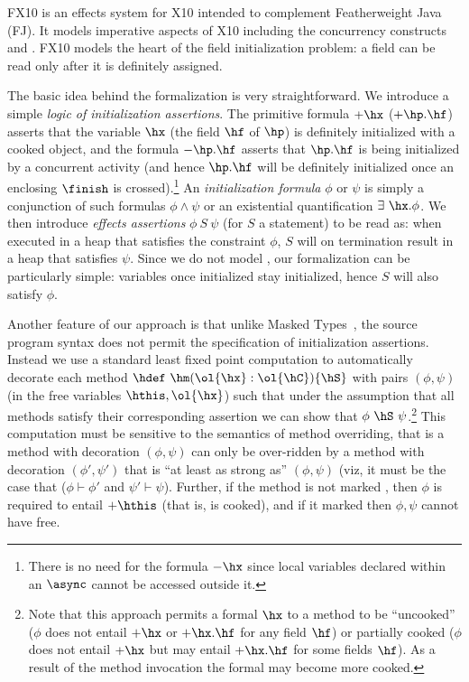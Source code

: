 FX10 is an effects system for X10 intended to complement Featherweight Java
(FJ). It models imperative aspects of X10 including the concurrency
constructs \finish{} and \async{}. 
FX10 models the heart of the field initialization problem:
    a field can be read only after it  is definitely assigned. 


The basic idea behind the formalization is very straightforward. We
introduce a simple {\em logic of initialization assertions}.  The
primitive formula $+\hx$ ($+\hp.\hf$) asserts that the variable $\hx$
(the field $\hf$ of $\hp$) is definitely initialized with a cooked
object, and the formula $-\hp.\hf$ asserts that $\hp.\hf$ is being
initialized by a concurrent activity (and hence $\hp.\hf$ will be
definitely initialized once an enclosing $\finish$ is
crossed).\footnote{There is no need for the formula $-\hx$ since local
  variables declared within an $\async$ cannot be accessed outside
  it.}  An {\em initialization formula} $\phi$ or $\psi$ is simply a
conjunction of such formulas $\phi \wedge \psi$ or an existential
quantification $\exists~\hx.\phi$.  We then introduce {\em effects
  assertions} $\phi~S~\psi$ (for $S$ a statement) to be read as: when
executed in a heap that satisfies the constraint $\phi$, $S$ will on
termination result in a heap that satisfies $\psi$.  Since we do not
model , our formalization can be particularly simple:
variables once initialized stay initialized, hence $S$ will also
satisfy $\phi$.

Another feature of our approach is that unlike Masked
Types~\cite{XinQi:2009}, the source program syntax does not permit the
specification of initialization assertions. Instead we use a standard
least fixed point computation to automatically decorate each method
$\hdef~\hm(\ol{\hx}:\ol{\hC})\{\hS\}$ with pairs $(\phi, \psi)$ (in the free
variables $\hthis, \ol{\hx}$) such that under the assumption that all
methods satisfy their corresponding assertion we can show that
$\phi~\hS~\psi$.\footnote{Note that this approach permits a formal $\hx$ to a
  method to be ``uncooked'' ($\phi$ does not entail $+\hx$ or
  $+\hx.\hf$ for any field $\hf$) or partially cooked ($\phi$ does not
  entail $+\hx$ but may entail $+\hx.\hf$ for some fields $\hf$). As a
  result of the method invocation the formal may become more cooked.}
This computation must be sensitive to the semantics
of method overriding, that is a method with decoration $(\phi,\psi)$
can only be over-ridden by a method with decoration $(\phi',\psi')$
that is ``at least as strong as'' $(\phi,\psi)$ (viz, it must be the
case that ($\phi \vdash \phi'$ and $\psi' \vdash \psi$). Further, if
the method is not marked , then $\phi$ is required
to entail $+\hthis$ (that is,  is cooked), and if it marked
 then $\phi,\psi$ cannot have  free. 

